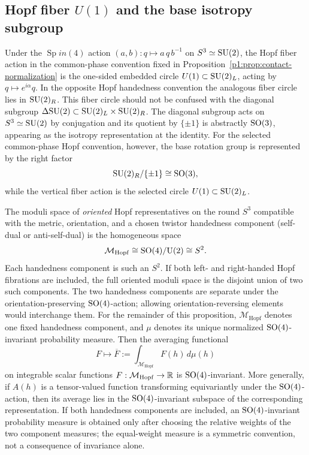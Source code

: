 \documentclass[11pt]{article}
\begin{document}
\subsection{\texorpdfstring{Hopf fiber $U(1)$ and the base isotropy subgroup}{Hopf fiber U(1) and the base isotropy subgroup}}
\label{p1:der:diagonal-embedding}
Under the $\operatorname{Sp}in(4)$ action $(a,b):q\mapsto a\,q\,b^{-1}$ on
$S^3\simeq\mathrm{SU}(2)$, the Hopf fiber action in the common-phase convention fixed in
Proposition~\ref{p1:prop:contact-normalization} is the one-sided embedded circle
$U(1)\subset\mathrm{SU}(2)_L$, acting by $q\mapsto e^{i\alpha}q$.  In the opposite Hopf
handedness convention the analogous fiber circle lies in $\mathrm{SU}(2)_R$.  This
fiber circle should not be confused with the diagonal subgroup
$\Delta\mathrm{SU}(2)\subset\mathrm{SU}(2)_L\times\mathrm{SU}(2)_R$.  The diagonal subgroup acts on
$S^3\simeq\mathrm{SU}(2)$ by conjugation and its quotient by $\{\pm1\}$ is abstractly
$\mathrm{SO}(3)$, appearing as the isotropy representation at the identity.  For the
selected common-phase Hopf convention, however, the base rotation group is
represented by the right factor
\[
\mathrm{SU}(2)_R/\{\pm1\}\cong\mathrm{SO}(3),
\]
while the vertical fiber action is the selected circle $U(1)\subset\mathrm{SU}(2)_L$.
\begin{proposition}
\label{p1:prop:hopf-ensemble-isotropy}
The moduli space of \emph{oriented} Hopf representatives on the round $S^3$
compatible with the metric, orientation, and a chosen twistor handedness
component (self-dual or anti-self-dual) is the homogeneous space
\[
\mathcal M_{\mathrm{Hopf}}\cong \mathrm{SO}(4)/\mathrm U(2)\cong S^2.
\]
Each handedness component is such an $S^2$. If both left- and right-handed Hopf fibrations are included, the full oriented moduli space is the disjoint union of two such components. The two handedness components are separate under the orientation-preserving $\mathrm{SO}(4)$-action; allowing orientation-reversing elements would interchange them.
For the remainder of this proposition, \(\mathcal M_{\mathrm{Hopf}}\) denotes one fixed handedness component, and \(\mu\) denotes its unique normalized \(\mathrm{SO}(4)\)-invariant probability measure. Then the averaging functional
\[
F\longmapsto \overline{F}:=\int_{\mathcal M_{\mathrm{Hopf}}}F(h)\,d\mu(h)
\]
on integrable scalar functions \(F:\mathcal M_{\mathrm{Hopf}}\to \mathbb{R}\) is
\(\mathrm{SO}(4)\)-invariant. More generally, if \(A(h)\) is a tensor-valued function
transforming equivariantly under the \(\mathrm{SO}(4)\)-action, then its average lies in
the \(\mathrm{SO}(4)\)-invariant subspace of the corresponding representation. If both handedness components are included, an \(\mathrm{SO}(4)\)-invariant probability measure is obtained only after choosing the relative weights of the two component measures; the equal-weight measure is a symmetric convention, not a consequence of invariance alone.
\end{proposition}
\end{document}
